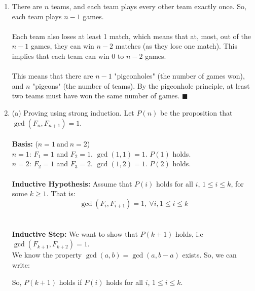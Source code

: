 \documentclass[a4paper]{article}
\begin{document}
\begin{enumerate}
\item There are $n$ teams, and each team plays every other team exactly once. So, each team plays $n-1$ games.\\
\\
Each team also loses at least 1 match, which means that at, most, out of the $n-1$ games, they can win $n-2$ matches (as they lose one match). This implies that each team can win $0$ to $n-2$ games.\\
\\
This means that there are $n-1$ "pigeonholes" (the number of games won), and $n$ "pigeons" (the number of teams). By the pigeonhole principle, at least two teams must have won the same number of games. $\blacksquare$\\

\item (a) Proving using strong induction. Let $P(n)$ be the proposition that $\gcd(F_{n}, F_{n+1}) = 1$.\\
\\
\textbf{Basis:} ($n=1\ \text{and}\ n=2$)\\
$n=1$: $F_{1} = 1$ and $F_{2} = 1$. $\gcd(1, 1) = 1$. $P(1)$ holds.\\
$n=2$: $F_{2} = 1$ and $F_{3} = 2$. $\gcd(1, 2) = 1$. $P(2)$ holds.\\
\\
\textbf{Inductive Hypothesis:} Assume that $P(i)$ holds for all $i$, $1 \leq i \leq k$, for some $k \geq 1$. That is:
$$\gcd(F_{i}, F_{i+1}) = 1,\ \forall i, 1 \leq i \leq k$$\\
\\
\textbf{Inductive Step:} We want to show that $P(k+1)$ holds, i.e $\gcd(F_{k+1}, F_{k+2}) = 1$.\\
We know the property $\gcd(a, b) = \gcd(a, b -  a)$ exists. So, we can write:

So, $P(k+1)$ holds if $P(i)$ holds for all $i$, $1 \leq i \leq k$.


\end{enumerate}
\end{document}
